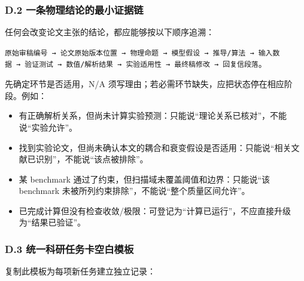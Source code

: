 \documentclass[
]{article}
\providecommand{\tightlist}{%
  \setlength{\itemsep}{0pt}\setlength{\parskip}{0pt}}
\begin{document}
\subsubsection{D.2
一条物理结论的最小证据链}\label{d.2-ux4e00ux6761ux7269ux7406ux7ed3ux8bbaux7684ux6700ux5c0fux8bc1ux636eux94fe}

任何会改变论文主张的结论，都应能够按以下顺序追溯：

\texttt{原始审稿编号\ →\ 论文原始版本位置\ →\ 物理命题\ →\ 模型假设\ →\ 推导/算法\ →\ 输入数据\ →\ 验证测试\ →\ 数值/解析结果\ →\ 实验适用性\ →\ 最终稿修改\ →\ 回复信段落}。

先确定环节是否适用，N/A
须写理由；若必需环节缺失，应把状态停在相应阶段。例如：

\begin{itemize}
\tightlist
\item
  有正确解析关系，但尚未计算实验预测：只能说``理论关系已核对''，不能说``实验允许''。
\item
  找到实验论文，但尚未确认本文的耦合和衰变假设是否适用：只能说``相关文献已识别''，不能说``该点被排除''。
\item
  某 benchmark 通过了约束，但扫描域未覆盖阈值和边界：只能说``该
  benchmark 未被所列约束排除''，不能说``整个质量区间允许''。
\item
  已完成计算但没有检查收敛/极限：可登记为``计算已运行''，不应直接升级为``结果已验证''。
\end{itemize}

\subsubsection{D.3
统一科研任务卡空白模板}\label{d.3-ux7edfux4e00ux79d1ux7814ux4efbux52a1ux5361ux7a7aux767dux6a21ux677f}

复制此模板为每项新任务建立独立记录：
\end{document}
